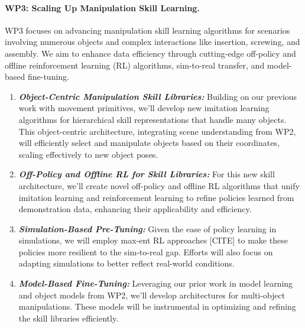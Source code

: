 \begin{refsection}
\paragraph{WP3: Scaling Up Manipulation Skill Learning.} 
WP3 focuses on advancing manipulation skill learning algorithms for scenarios involving numerous objects and complex interactions like insertion, screwing, and assembly. We aim to enhance data efficiency through cutting-edge off-policy and offline reinforcement learning (RL) algorithms, sim-to-real transfer, and model-based fine-tuning.
\begin{enumerate}[noitemsep, topsep=0pt, partopsep=0pt, label=\alph*), leftmargin=0em, itemindent=1em, labelindent=1em, labelwidth=*]
\item \textit{\textbf{Object-Centric Manipulation Skill Libraries:}} Building on our previous work with movement primitives, we'll develop new imitation learning algorithms for hierarchical skill representations that handle many objects. This object-centric architecture, integrating scene understanding from WP2, will efficiently select and manipulate objects based on their coordinates, scaling effectively to new object poses. 
\item \textit{\textbf{ Off-Policy and Offline RL for Skill Libraries:}} For this new skill architecture, we'll create novel off-policy and offline RL algorithms that unify imitation learning and reinforcement learning to refine policies learned from demonstration data, enhancing their applicability and efficiency.
\item \textit{\textbf{ Simulation-Based Pre-Tuning:}} Given the ease of policy learning in simulations, we will employ max-ent RL approaches [CITE] to make these policies more resilient to the sim-to-real gap. Efforts will also focus on adapting simulations to better reflect real-world conditions. 
\item \textit{\textbf{ Model-Based Fine-Tuning:}} Leveraging our prior work in model learning and object models from WP2, we'll develop architectures for multi-object manipulations. These models will be instrumental in optimizing and refining the skill libraries efficiently.
\end{enumerate}
\vspace{-0.3cm}

\end{refsection}
